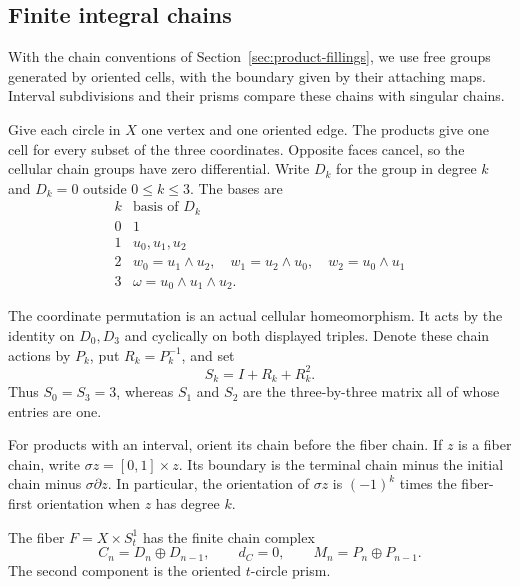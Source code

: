 \subsection{Finite integral chains}

With the chain conventions of Section~\ref{sec:product-fillings},
we use free groups generated by oriented cells, with the boundary
given by their attaching maps. Interval subdivisions and their prisms
compare these chains with singular chains.

Give each circle in $X$ one vertex and one oriented edge. The products
give one cell for every subset of the three coordinates. Opposite
faces cancel, so the cellular chain groups have zero differential.
Write $D_k$ for the group in degree $k$ and $D_k=0$ outside $0\le k\le3$.
The bases are
\begin{equation}\label{marked-local:eq:cell-bases}
 \begin{array}{c|c}
 k&\text{basis of }D_k\\ \hline
 0&1\\
 1&u_0,u_1,u_2\\
 2&w_0=u_1\wedge u_2,
     \quad w_1=u_2\wedge u_0,
     \quad w_2=u_0\wedge u_1\\
 3&\omega=u_0\wedge u_1\wedge u_2.
 \end{array}
\end{equation}

The coordinate permutation is an actual cellular homeomorphism. It acts
by the identity on $D_0,D_3$ and cyclically on both displayed triples.
Denote these chain actions by $P_k$, put $R_k=P_k^{-1}$, and set
\begin{equation}\label{marked-local:eq:norm}
                 S_k=I+R_k+R_k^2.
\end{equation}
Thus $S_0=S_3=3$, whereas $S_1$ and $S_2$ are the three-by-three
matrix all of whose entries are one.

For products with an interval, orient its chain before the fiber chain.
If $z$ is a fiber chain, write $\sigma z=[0,1]\times z$.
Its boundary is the terminal chain minus the initial chain minus
$\sigma\partial z$. In particular, the orientation of $\sigma z$
is $(-1)^k$ times the fiber-first orientation when $z$ has degree $k$.

The fiber $F=X\times S^1_t$ has the finite chain complex
\begin{equation}\label{marked-local:eq:fibre-complex}
 C_n=D_n\oplus D_{n-1},\qquad d_C=0,
 \qquad M_n=P_n\oplus P_{n-1}.
\end{equation}
The second component is the oriented $t$-circle prism.

